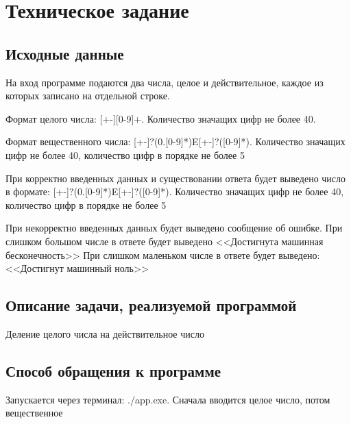 \chapter{Техническое задание}
\section{Исходные данные}
	На вход программе подаются два числа, целое и действительное, каждое из которых записано на отдельной строке.\par 
	Формат целого числа: [+-][0-9]+. Количество значащих цифр не более 40. \par
	Формат вещественного числа: [+-]?(0.[0-9]*)E[+-]?([0-9]*). Количество значащих цифр не более 40, количество цифр в порядке не более 5\par
	При корректно введенных данных и существовании ответа будет выведено число в формате: [+-]?(0.[0-9]*)E[+-]?([0-9]*). Количество значащих цифр не более 40, количество цифр в порядке не более 5\par
	При некорректно введенных данных будет выведено сообщение об ошибке. При слишком большом числе в ответе будет выведено <<Достигнута машинная бесконечность>> При слишком маленьком числе в ответе будет выведено: <<Достигнут машинный ноль>>


\section{Описание задачи, реализуемой программой}
	Деление целого числа на действительное число

\section{Способ обращения к программе}
	Запускается через терминал: ./app.exe. Сначала вводится целое число, потом вещественное

